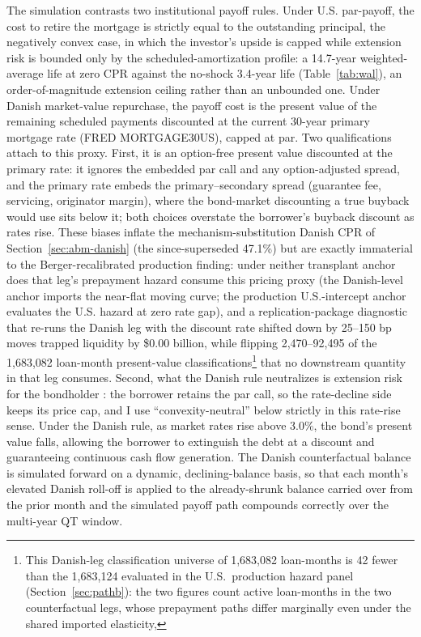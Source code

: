 \documentclass[12pt]{article}
\begin{document}
The simulation contrasts two institutional payoff rules. Under U.S. par-payoff, the cost to retire the mortgage is strictly equal to the outstanding principal, the negatively convex case, in which the investor's upside is capped while extension risk is bounded only by the scheduled-amortization profile: a 14.7-year weighted-average life at zero CPR against the no-shock 3.4-year life (Table~\ref{tab:wal}), an order-of-magnitude extension ceiling rather than an unbounded one. Under Danish market-value repurchase, the payoff cost is the present value of the remaining scheduled payments discounted at the current 30-year primary mortgage rate (FRED MORTGAGE30US), capped at par. Two qualifications attach to this proxy. First, it is an option-free present value discounted at the primary rate: it ignores the embedded par call and any option-adjusted spread, and the primary rate embeds the primary--secondary spread (guarantee fee, servicing, originator margin), where the bond-market discounting a true buyback would use sits below it; both choices overstate the borrower's buyback discount as rates rise. These biases inflate the mechanism-substitution Danish CPR of Section~\ref{sec:abm-danish} (the since-superseded 47.1\%) but are exactly immaterial to the Berger-recalibrated production finding: under neither transplant anchor does that leg's prepayment hazard consume this pricing proxy (the Danish-level anchor imports the near-flat moving curve; the production U.S.-intercept anchor evaluates the U.S. hazard at zero rate gap), and a replication-package diagnostic that re-runs the Danish leg with the discount rate shifted down by 25--150 bp moves trapped liquidity by \$0.00 billion, while flipping 2,470--92,495 of the 1,683,082 loan-month present-value classifications\footnote{This Danish-leg classification universe of 1{,}683{,}082 loan-months is 42 fewer than the 1{,}683{,}124 evaluated in the U.S.\ production hazard panel (Section~\ref{sec:pathb}): the two figures count active loan-months in the two counterfactual legs, whose prepayment paths differ marginally even under the shared imported elasticity,} that no downstream quantity in that leg consumes. Second, what the Danish rule neutralizes is extension risk for the bondholder \citep{berger2026}: the borrower retains the par call, so the rate-decline side keeps its price cap, and I use ``convexity-neutral'' below strictly in this rate-rise sense. Under the Danish rule, as market rates rise above 3.0\%, the bond's present value falls, allowing the borrower to extinguish the debt at a discount and guaranteeing continuous cash flow generation. The Danish counterfactual balance is simulated forward on a dynamic, declining-balance basis, so that each month's elevated Danish roll-off is applied to the already-shrunk balance carried over from the prior month and the simulated payoff path compounds correctly over the multi-year QT window.
\end{document}
